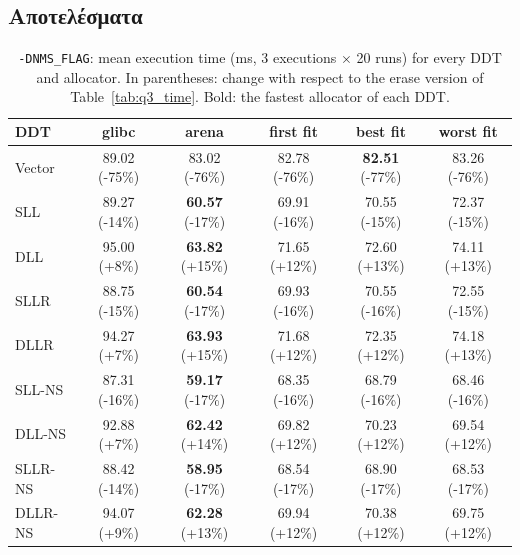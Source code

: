\documentclass[11pt,a4paper]{article}
\begin{document}
\subsection{Αποτελέσματα}
\begin{table}[H]
\centering
\caption{\texttt{-DNMS\_FLAG}: mean execution time (ms, 3 executions $\times$ 20 runs) for every DDT and allocator. In parentheses: change with respect to the erase version of Table~\ref{tab:q3_time}. Bold: the fastest allocator of each DDT.}
\label{tab:q4_time}
\begin{tabular}{@{}lccccc@{}}
\toprule
DDT & glibc & arena & first fit & best fit & worst fit \\
\midrule
Vector & 89.02 \scriptsize(-75\%) & 83.02 \scriptsize(-76\%) & 82.78 \scriptsize(-76\%) & \textbf{82.51} \scriptsize(-77\%) & 83.26 \scriptsize(-76\%) \\
SLL & 89.27 \scriptsize(-14\%) & \textbf{60.57} \scriptsize(-17\%) & 69.91 \scriptsize(-16\%) & 70.55 \scriptsize(-15\%) & 72.37 \scriptsize(-15\%) \\
DLL & 95.00 \scriptsize(+8\%) & \textbf{63.82} \scriptsize(+15\%) & 71.65 \scriptsize(+12\%) & 72.60 \scriptsize(+13\%) & 74.11 \scriptsize(+13\%) \\
SLLR & 88.75 \scriptsize(-15\%) & \textbf{60.54} \scriptsize(-17\%) & 69.93 \scriptsize(-16\%) & 70.55 \scriptsize(-16\%) & 72.55 \scriptsize(-15\%) \\
DLLR & 94.27 \scriptsize(+7\%) & \textbf{63.93} \scriptsize(+15\%) & 71.68 \scriptsize(+12\%) & 72.35 \scriptsize(+12\%) & 74.18 \scriptsize(+13\%) \\
SLL-NS & 87.31 \scriptsize(-16\%) & \textbf{59.17} \scriptsize(-17\%) & 68.35 \scriptsize(-16\%) & 68.79 \scriptsize(-16\%) & 68.46 \scriptsize(-16\%) \\
DLL-NS & 92.88 \scriptsize(+7\%) & \textbf{62.42} \scriptsize(+14\%) & 69.82 \scriptsize(+12\%) & 70.23 \scriptsize(+12\%) & 69.54 \scriptsize(+12\%) \\
SLLR-NS & 88.42 \scriptsize(-14\%) & \textbf{58.95} \scriptsize(-17\%) & 68.54 \scriptsize(-17\%) & 68.90 \scriptsize(-17\%) & 68.53 \scriptsize(-17\%) \\
DLLR-NS & 94.07 \scriptsize(+9\%) & \textbf{62.28} \scriptsize(+13\%) & 69.94 \scriptsize(+12\%) & 70.38 \scriptsize(+12\%) & 69.75 \scriptsize(+12\%) \\
\bottomrule
\end{tabular}
\end{table}
\end{document}

